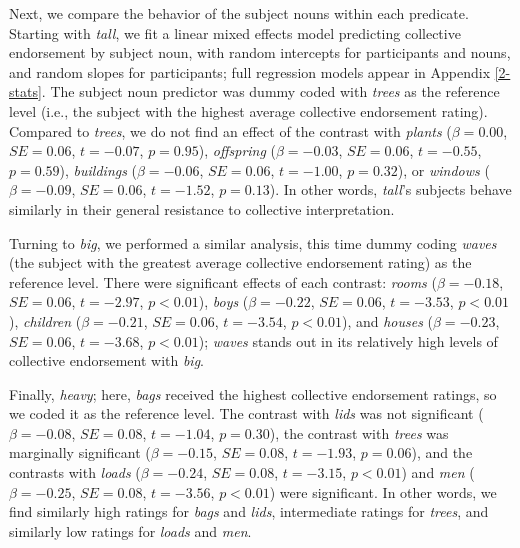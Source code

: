\documentclass[linguex]{sp}
\newcommand{\ndg}[1]{\textcolor{Green}{[ndg: #1]}}
\begin{document}

Next, we compare the behavior of the subject nouns within each predicate.  Starting with \emph{tall}, we fit a linear mixed effects model predicting collective endorsement by subject noun, with random intercepts for participants and nouns, and random slopes for participants; full regression models appear in Appendix \ref{2-stats}. The subject noun predictor was dummy coded with \emph{trees} as the reference level (i.e., the subject with the highest average collective endorsement rating). Compared to \emph{trees}, we do not find an effect of the contrast with \emph{plants} ($\beta=0.00$, $SE=0.06$, $t=-0.07$, $p=0.95$), \emph{offspring} ($\beta=-0.03$, $SE=0.06$, $t=-0.55$, $p=0.59$), \emph{buildings} ($\beta=-0.06$, $SE=0.06$, $t=-1.00$, $p=0.32$), or \emph{windows} ($\beta=-0.09$, $SE=0.06$, $t=-1.52$, $p=0.13$). In other words, \emph{tall}'s subjects behave similarly in their general resistance to collective interpretation. 

Turning to \emph{big}, we performed a similar analysis, this time dummy coding \emph{waves} (the subject with the greatest average collective endorsement rating) as the reference level. There were significant effects of each contrast: \emph{rooms} ($\beta=-0.18$, $SE=0.06$, $t=-2.97$, $p<0.01$), \emph{boys} ($\beta=-0.22$, $SE=0.06$, $t=-3.53$, $p<0.01$), \emph{children} ($\beta=-0.21$, $SE=0.06$, $t=-3.54$, $p<0.01$), and \emph{houses} ($\beta=-0.23$, $SE=0.06$, $t=-3.68$, $p<0.01$); \emph{waves} stands out in its relatively high levels of collective endorsement with \emph{big}.

Finally, \emph{heavy}; here, \emph{bags} received the highest collective endorsement ratings, so we coded it as the reference level. The contrast with \emph{lids} was not significant ($\beta=-0.08$, $SE=0.08$, $t=-1.04$, $p=0.30$), the contrast with \emph{trees} was marginally significant ($\beta=-0.15$, $SE=0.08$, $t=-1.93$, $p=0.06$), and the contrasts with \emph{loads} ($\beta=-0.24$, $SE=0.08$, $t=-3.15$, $p<0.01$) and \emph{men} ($\beta=-0.25$, $SE=0.08$, $t=-3.56$, $p<0.01$) were significant. In other words, we find similarly high ratings for \emph{bags} and \emph{lids}, intermediate ratings for \emph{trees}, and similarly low ratings for \emph{loads} and \emph{men}.
\end{document}
